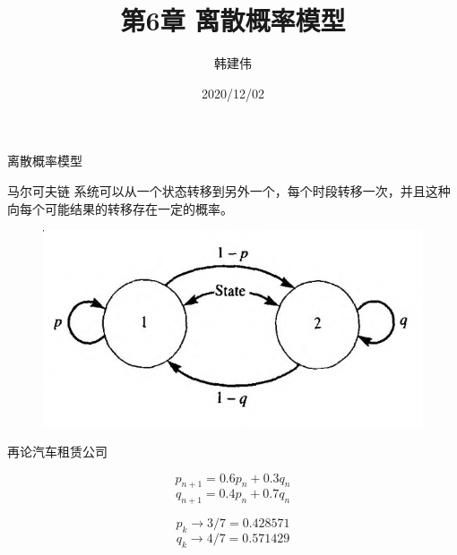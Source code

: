 \documentclass[UTF8]{ctexbeamer}
\title{第6章 离散概率模型}
\author{韩建伟}
\institute{
  信息学院\\
  \texttt{hanjianwei@zjgsu.edu.cn}
}
\date{2020/12/02}
\begin{document}
\begin{frame}[plain]
  \titlepage{}
\end{frame}

\begin{frame}{离散概率模型}

  \begin{block}{马尔可夫链}
    系统可以从一个状态转移到另外一个，每个时段转移一次，并且这种向每个可能结果的转移存在一定的概率。
  \end{block}

  \begin{figure}
    \centering
    \includegraphics[width=0.6\textwidth{}]{markov.png}
  \end{figure}

\end{frame}

\begin{frame}{再论汽车租赁公司}
  \begin{figure}
    \centering
  \end{figure}

  \[
  p_{n+1} = 0.6p_n + 0.3q_n
  \]
  \[
  q_{n+1} = 0.4p_n + 0.7q_n
  \]

  \[
  p_k \rightarrow 3/7 = 0.428571
  \]
  \[
  q_k \rightarrow 4/7 = 0.571429
  \]
\end{frame}
\end{document}
